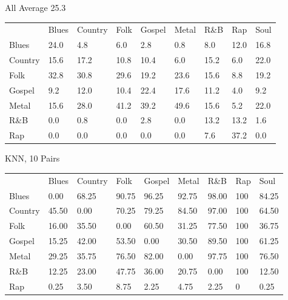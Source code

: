 \documentclass[a4paper,oneside]{article}
\begin{document}
All
Average 25.3
\begin{table}
\begin{tabular}{|l||*{8}{l|}} \hline
 & Blues & Country & Folk & Gospel & Metal & R\&B & Rap & Soul \\ \hhline{|=||*{8}{=|}}
Blues & 24.0 & 4.8 & 6.0 & 2.8 & 0.8 & 8.0 & 12.0 & 16.8 \\ \hline
Country & 15.6 & 17.2 & 10.8 & 10.4 & 6.0 & 15.2 & 6.0 & 22.0 \\ \hline
Folk & 32.8 & 30.8 & 29.6 & 19.2 & 23.6 & 15.6 & 8.8 & 19.2 \\ \hline
Gospel & 9.2 & 12.0 & 10.4 & 22.4 & 17.6 & 11.2 & 4.0 & 9.2 \\ \hline
Metal & 15.6 & 28.0 & 41.2 & 39.2 & 49.6 & 15.6 & 5.2 & 22.0 \\ \hline
R\&B & 0.0 & 0.8 & 0.0 & 2.8 & 0.0 & 13.2 & 13.2 & 1.6 \\ \hline
Rap & 0.0 & 0.0 & 0.0 & 0.0 & 0.0 & 7.6 & 37.2 & 0.0 \\ \hline
\end{tabular}
\end{table}

KNN, 10
Pairs
\begin{table}
\begin{tabular}{|l||*{8}{l|}} \hline
 & Blues & Country & Folk & Gospel & Metal & R\&B & Rap & Soul \\ \hhline{|=||*{8}{=|}}
Blues & 0.00 & 68.25 & 90.75 & 96.25 & 92.75 & 98.00 & 100 & 84.25 \\ \hline
Country & 45.50 & 0.00 & 70.25 & 79.25 & 84.50 & 97.00 & 100 & 64.50 \\ \hline
Folk & 16.00 & 35.50 & 0.00 & 60.50 & 31.25 & 77.50 & 100 & 36.75 \\ \hline
Gospel & 15.25 & 42.00 & 53.50 & 0.00 & 30.50 & 89.50 & 100 & 61.25 \\ \hline
Metal & 29.25 & 35.75 & 76.50 & 82.00 & 0.00 & 97.75 & 100 & 76.50 \\ \hline
R\&B & 12.25 & 23.00 & 47.75 & 36.00 & 20.75 & 0.00 & 100 & 12.50 \\ \hline
Rap & 0.25 & 3.50 & 8.75 & 2.25 & 4.75 & 2.25 & 0 & 0.25 \\ \hline
\end{tabular}
\end{table}
\end{document}
